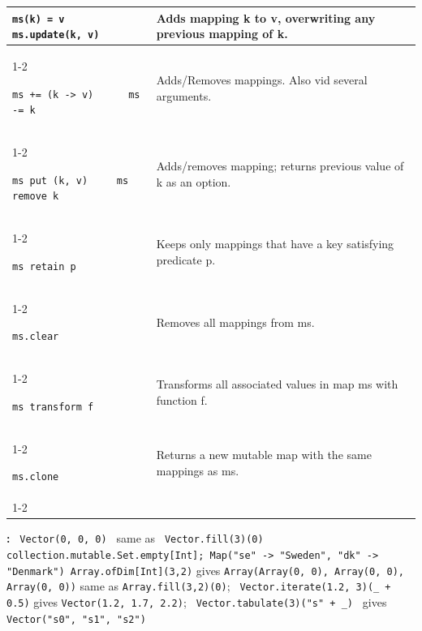 \documentclass[article, a5paper]{memoir}
\newcommand{\LangColor}{red}
\newcommand{\head}[1]{{\bfseries {\color{\LangColor}{#1}}\par\vspace{1mm}\hrule\vspace{-2mm}}}
\renewcommand{\arraystretch}{0.9}
\newcommand{\code}{\lstinline[basicstyle=\ttfamily]}
\newcommand{\Newline}{\vspace{\baselineskip}}
\begin{document}
{\small\renewcommand{\arraystretch}{1.15}
\begin{tabular}{@{}p{5.0cm}  p{6.8cm}}

\texttt{ms(k) = v ~~ ms.update(k, v)} & Adds mapping k to v, overwriting any previous mapping of k.\\   \cline{1-2}

\texttt{ms += (k -> v) ~~~~ ms -= k} & Adds/Removes mappings. Also vid several arguments.\\   \cline{1-2}

\texttt{ms put (k, v) ~~~ ms remove k}& Adds/removes mapping; returns previous value of k as an option.\\   \cline{1-2}

\texttt{ms retain p} & Keeps only mappings that have a key satisfying predicate p.\\   \cline{1-2}

\texttt{ms.clear} & Removes all mappings from ms.\\   \cline{1-2}

\texttt{ms transform f} & Transforms all associated values in map ms with function f.\\   \cline{1-2}

\code|ms.clone| & Returns a new mutable map with the same mappings as ms.\\   \cline{1-2}
        
\end{tabular}
}  
\vspace{0.5em}

\textbf{\color{\LangColor}{Factory methods examples}:}
{\small \texttt{ Vector(0, 0, 0) } same as \texttt{ Vector.fill(3)(0)} 
\texttt{ collection.mutable.Set.empty[Int]; Map("se" -> "Sweden", "dk" -> "Denmark")
\newline Array.ofDim[Int](3,2)} gives \texttt{Array(Array(0, 0), Array(0, 0), Array(0, 0))} same as \texttt{Array.fill(3,2)(0)}; 
\texttt{ Vector.iterate(1.2, 3)(\_ + 0.5)} gives \texttt{Vector(1.2, 1.7, 2.2)}; 
\newline \texttt{ Vector.tabulate(3)("s" + \_) } gives \code{ Vector("s0", "s1", "s2")}
}




\clearpage

\Newline\head{Strings}\Newline
\end{document}
